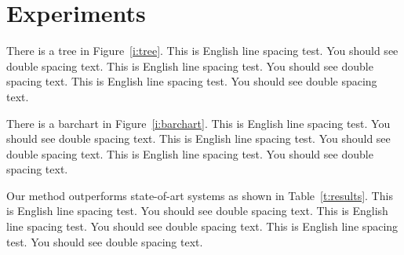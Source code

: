 \chapter{Experiments}
\label{c:experiment}

There is a tree in Figure~\ref{i:tree}.
This is English line spacing test. You should see double spacing text.
This is English line spacing test. You should see double spacing text.
This is English line spacing test. You should see double spacing text.



There is a barchart in Figure~\ref{i:barchart}.
This is English line spacing test. You should see double spacing text.
This is English line spacing test. You should see double spacing text.
This is English line spacing test. You should see double spacing text.



Our method outperforms state-of-art systems as shown in Table~\ref{t:results}.
This is English line spacing test. You should see double spacing text.
This is English line spacing test. You should see double spacing text.
This is English line spacing test. You should see double spacing text.


